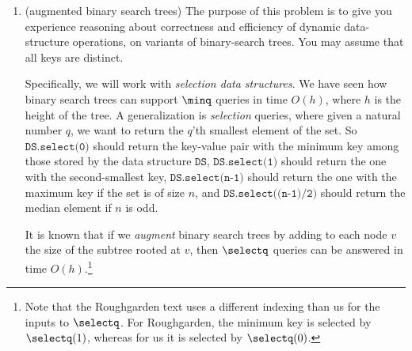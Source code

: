 \documentclass[11pt]{article}
\begin{document}
\begin{enumerate}
\begin{mysolution}
    	\qquad Since each $\Gamma$ oracle has an input of $m\leq h_1(n)$, and since the reduction from $\Gamma$ to $\Lambda$ calls the $\Lambda$ oracle with an input of $p\leq h_2(m)$, because $h_2$ is non-decreasing then we know $p\leq h_2(m)\leq h_2(h_1(n))$, so $h_3(n)=h_2(h_1(n))$.
    	
    	\qquad Since the $\Gamma$ to $\Lambda$ reduction (as partial witness to the oracle) is called at most $q_1(n)$ times with max input size $h_1(n)$, because its runtime is $O(T_2(m))$ where $m\leq h_1(n)$, since $T_2$ is non-decreasing we know that the total witness runtime (still abstracting the $\Lambda$ oracle) is at most $q_1(n)\cdot O(T_2(h_1(n)))$. So, accounting for the non-oracle runtime in the reduction from $\Pi$ to $\Gamma$, the total composite reduction's runtime is $T_3=T_1(n)+q_1(n)\cdot T_2(h_1(n))$. We got rid of the big $O$ in $T_3$ since it was moved outside of $T_3$ for total runtime.
    \end{mysolution}


    \newpage

    \item (augmented binary search trees)
    The purpose of this problem is to give you experience reasoning about correctness and efficiency of dynamic data-structure operations, on variants of binary-search trees. You may assume that all keys are distinct.
    
    Specifically, we will work with {\em selection data structures}.
    We have seen how binary search trees can support $\minq$ queries in time $O(h)$, where $h$ is the height of the tree.  A generalization is {\em selection} queries, where given a natural number $q$, we want to return the $q$'th smallest element of the set.  So $\texttt{DS.select(0)}$ should return the key-value pair with the minimum key among those stored by the data structure $\texttt{DS}$, $\texttt{DS.select(1)}$ should return the one with the second-smallest key, $\texttt{DS.select(n-1)}$ should return the one with the maximum key if the set is of size $n$, and $\texttt{DS.select((n-1)/2)}$ should return the median element if $n$ is odd.
    
    It is known that if we {\em augment} binary search trees by adding to each node $v$ the size of the subtree rooted at $v$, then $\selectq$ queries can be answered in time $O(h)$.\footnote{Note that the Roughgarden text uses a different indexing than us for the inputs to $\selectq$. For Roughgarden, the minimum key is selected by $\selectq(1)$, whereas for us it is selected by $\selectq(0)$.}


\end{enumerate}
\end{document}
